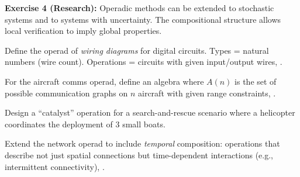 \begin{solution}
\textbf{Exercise 4 (Research):} Operadic methods can be extended to stochastic systems and to systems with uncertainty. The compositional structure allows local verification to imply global properties.
\end{solution}

\label{sec:op:exercises}

\begin{exercise}
Define the operad of \emph{wiring diagrams} for digital circuits. Types = natural numbers (wire count). Operations = circuits with given input/output wires, \cite{baez2021operads}.
\end{exercise}

\begin{exercise}
For the aircraft comms operad, define an algebra where $A(n)$ is the set of possible communication graphs on $n$ aircraft with given range constraints, \cite{baez2021operads}.
\end{exercise}

\begin{exercise}
Design a ``catalyst'' operation for a search-and-rescue scenario where a helicopter coordinates the deployment of 3 small boats.
\end{exercise}

\begin{exercise}[Research]
Extend the network operad to include \emph{temporal} composition: operations that describe not just spatial connections but time-dependent interactions (e.g., intermittent connectivity), \cite{baez2021operads}.
\end{exercise}